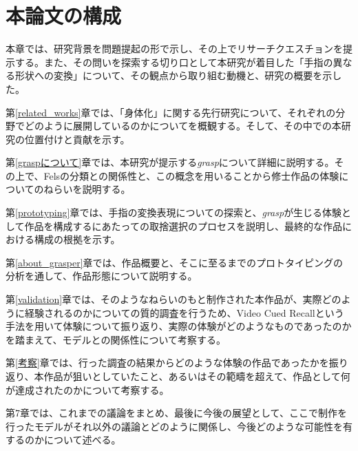 \section{本論文の構成}
本章では、研究背景を問題提起の形で示し、その上でリサーチクエスチョンを提示する。また、その問いを探索する切り口として本研究が着目した「手指の異なる形状への変換」について、その観点から取り組む動機と、研究の概要を示した。

第\ref{related_works}章では、「身体化」に関する先行研究について、それぞれの分野でどのように展開しているのかについてを概観する。そして、その中での本研究の位置付けと貢献を示す。

第\ref{graspについて}章では、本研究が提示する\textit{grasp}について詳細に説明する。その上で、Felsの分類との関係性と、この概念を用いることから修士作品の体験についてのねらいを説明する。

第\ref{prototyping}章では、手指の変換表現についての探索と、\textit{grasp}が生じる体験として作品を構成するにあたっての取捨選択のプロセスを説明し、最終的な作品における構成の根拠を示す。

第\ref{about_grasper}章では、作品概要と、そこに至るまでのプロトタイピングの分析を通して、作品形態について説明する。

第\ref{validation}章では、そのようなねらいのもと制作された本作品が、実際どのように経験されるのかについての質的調査を行うため、Video Cued Recallという手法を用いて体験について振り返り、実際の体験がどのようなものであったのかを踏まえて、モデルとの関係性について考察する。

第\ref{考察}章では、行った調査の結果からどのような体験の作品であったかを振り返り、本作品が狙いとしていたこと、あるいはその範疇を超えて、作品として何が達成されたのかについて考察する。

第7章では、これまでの議論をまとめ、最後に今後の展望として、ここで制作を行ったモデルがそれ以外の議論とどのように関係し、今後どのような可能性を有するのかについて述べる。